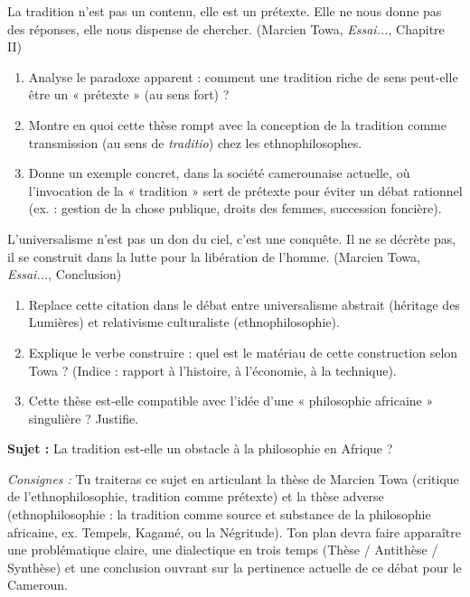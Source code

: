 \documentclass[11pt]{article}
\newcommand{\cle}[1]{{\popxbold\color{popdark}#1}}
\newcounter{popsec}
\newcounter{popsub}
\newcommand{\courssub}[1]{%
  \stepcounter{popsub}%
  \par\vspace{9pt}\noindent{\popxbold\fontsize{11.5}{13}\selectfont\color{popink}{\color{poporange}\thepopsec.\thepopsub}\hspace{6pt}#1}\par\nopagebreak\vspace{4pt}
}
\begin{document}
\begin{exercice}
\guillemotleft La tradition n'est pas un contenu, elle est un prétexte. Elle ne nous donne pas des réponses, elle nous dispense de chercher. \guillemotright (Marcien Towa, \emph{Essai...}, Chapitre II)

\begin{enumerate}
\item Analyse le paradoxe apparent : comment une tradition riche de sens peut-elle être un « prétexte » (au sens fort) ?
\item Montre en quoi cette thèse rompt avec la conception de la tradition comme \cle{transmission} (au sens de \emph{traditio}) chez les ethnophilosophes.
\item Donne un exemple concret, dans la société camerounaise actuelle, où l'invocation de la « tradition » sert de prétexte pour éviter un débat rationnel (ex. : gestion de la chose publique, droits des femmes, succession foncière).
\end{enumerate}
\end{exercice}

\begin{exercice}
\guillemotleft L'universalisme n'est pas un don du ciel, c'est une conquête. Il ne se décrète pas, il se construit dans la lutte pour la libération de l'homme. \guillemotright (Marcien Towa, \emph{Essai...}, Conclusion)

\begin{enumerate}
\item Replace cette citation dans le débat entre \cle{universalisme abstrait} (héritage des Lumières) et \cle{relativisme culturaliste} (ethnophilosophie).
\item Explique le verbe \cle{construire} : quel est le matériau de cette construction selon Towa ? (Indice : rapport à l'histoire, à l'économie, à la technique).
\item Cette thèse est-elle compatible avec l'idée d'une « philosophie africaine » singulière ? Justifie.
\end{enumerate}
\end{exercice}

\courssub{Je me prépare au Bac}

\begin{exercice}
\textbf{Sujet :} \guillemotleft La tradition est-elle un obstacle à la philosophie en Afrique ? \guillemotright

\textit{Consignes :} Tu traiteras ce sujet en articulant la thèse de Marcien Towa (critique de l'ethnophilosophie, tradition comme prétexte) et la thèse adverse (ethnophilosophie : la tradition comme source et substance de la philosophie africaine, ex. Tempels, Kagamé, ou la Négritude). Ton plan devra faire apparaître une problématique claire, une dialectique en trois temps (Thèse / Antithèse / Synthèse) et une conclusion ouvrant sur la pertinence actuelle de ce débat pour le Cameroun.
\end{exercice}
\end{document}
